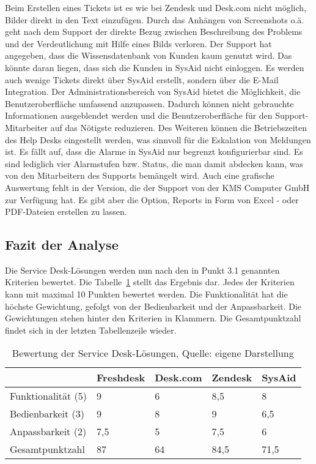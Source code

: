 Beim Erstellen eines Tickets ist es wie bei Zendesk und Desk.com nicht möglich, Bilder direkt in den Text einzufügen. Durch das Anhängen von Screenshots o.ä. geht nach dem Support der direkte Bezug zwischen Beschreibung des Problems und der Verdeutlichung mit Hilfe eines Bilds verloren.\newline
Der Support hat angegeben, dass die Wissensdatenbank von Kunden kaum genutzt wird. Das könnte daran liegen, dass sich die Kunden in SysAid nicht einloggen. Es werden auch wenige Tickets direkt über SysAid erstellt, sondern über die E-Mail Integration.\newline
Der Administrationsbereich von SysAid bietet die Möglichkeit, die Benutzeroberfläche umfassend anzupassen. Dadurch können nicht gebrauchte Informationen ausgeblendet werden und die Benutzeroberfläche für den Support-Mitarbeiter auf das Nötigste reduzieren. Des Weiteren können die Betriebszeiten des Help Desks eingestellt werden, was sinnvoll für die Eskalation von Meldungen ist.\newline
Es fällt auf, dass die Alarme in SysAid nur begrenzt konfigurierbar sind. Es sind lediglich vier Alarmstufen bzw. Status, die man damit abdecken kann, was von den Mitarbeitern des Supports bemängelt wird. Auch eine grafische Auswertung fehlt in der Version, die der Support von der KMS Computer GmbH zur Verfügung hat. Es gibt aber die Option, Reports in Form von Excel - oder PDF-Dateien erstellen zu lassen.

\subsection{Fazit der Analyse}

\noindent
Die Service Desk-Lösungen werden nun nach den in Punkt 3.1 genannten Kriterien bewertet. Die Tabelle~\ref{tab:Auswertung} stellt das Ergebnis dar. Jedes der Kriterien kann mit maximal 10 Punkten bewertet werden. Die Funktionalität hat die höchste Gewichtung, gefolgt von der Bedienbarkeit und der Anpassbarkeit. Die Gewichtungen stehen hinter den Kriterien in Klammern. Die Gesamtpunktzahl findet sich in der letzten Tabellenzeile wieder.\\

\begin{table}[h!]
    \begin{tabular}{ | p{3.5cm}| p{2.5cm} | p{2.5cm} | p{2.5cm} | p{2.5cm} |}
    \hline
       & Freshdesk & Desk.com & Zendesk & SysAid \\ \hline
   Funktionalität (5) & 9 & 6 & 8,5 & 8 \\ \hline
   Bedienbarkeit (3) & 9 & 8 & 9 & 6,5 \\ \hline
   Anpassbarkeit (2) & 7,5 & 5 & 7,5 & 6 \\ \hline
   Gesamtpunktzahl & 87 & 64 & 84,5 & 71,5 \\ \hline
    \end{tabular}
    \caption[Bewertung der Service Desk-Lösungen]{Bewertung der Service Desk-Lösungen, Quelle: eigene Darstellung}
    \label{tab:Auswertung}
\end{table}

